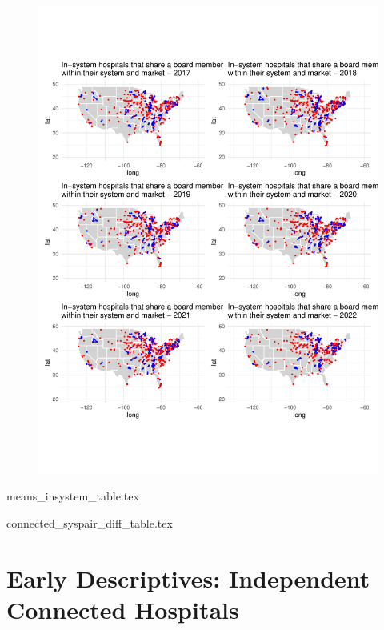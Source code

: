 \documentclass[12pt]{article}
\begin{document}
    \newpage
    

    \begin{figure}[ht!]
    \centering
        \includegraphics[width=.9\textwidth]{Objects/common_boards_insystem_maps.pdf}
        \label{fig:outcomes_graph}
    \end{figure}
    

    {means_insystem_table.tex}

    {connected_syspair_diff_table.tex}


    \newpage

    \section{Early Descriptives: Independent Connected Hospitals}
\end{document}
